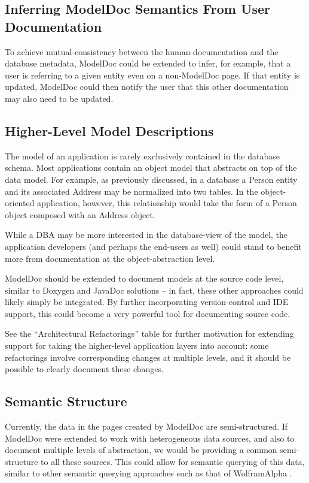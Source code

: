 \documentclass{acm_proc_article-sp}
\begin{document}
\subsection{Inferring ModelDoc Semantics From User Documentation}

To achieve mutual-consistency between the human-documentation and the database
metadata, ModelDoc could be extended to infer, for example, that a user is
referring to a given entity even on a non-ModelDoc page.  If that entity
is updated, ModelDoc could then notify the user that this other
documentation may also need to be updated.

\subsection{Higher-Level Model Descriptions}

The model of an application is rarely exclusively contained in the database
schema.  Most applications contain an object model that abstracts on top of the
data model.  For example, as previously discussed, in a database a Person entity and its associated Address
may be normalized into two tables.  In the object-oriented application,
however, this relationship would take the form of a Person object composed with
an Address object.

While a DBA may be more interested in the database-view of the model, the
application developers (and perhaps the end-users as well) could stand to
benefit more from documentation at the object-abstraction level.

ModelDoc should be extended to document models at the source code
level, similar to Doxygen and JavaDoc solutions -- in fact, these other approaches
could likely simply be integrated.  By further incorporating version-control
and IDE support, this could become a very powerful tool for documenting source
code.

See the ``Architectural Refactorings'' table for further motivation for
extending support for taking the higher-level application layers into account:
some refactorings involve corresponding changes at multiple levels, and it
should be possible to clearly document these changes.

\subsection{Semantic Structure}

Currently, the data in the pages created by ModelDoc are semi-structured.  If
ModelDoc were extended to work with heterogeneous data sources, and also to
document multiple levels of abstraction, we would be providing a common
semi-structure to all these sources.  This could allow for semantic querying of
this data, similar to other semantic querying approaches such as that of
WolframAlpha \cite{web:wolfram}.
\end{document}
